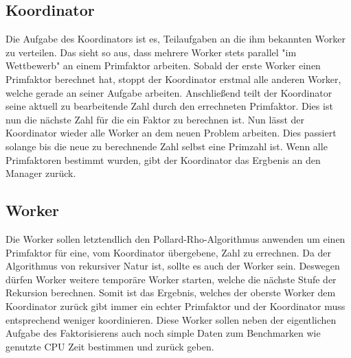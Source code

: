 \documentclass[a4paper, 12pt]{scrartcl}
\begin{document}
\subsection{Koordinator}
Die Aufgabe des Koordinators ist es, Teilaufgaben an die ihm bekannten Worker zu verteilen. Das sieht so aus, dass mehrere Worker stets parallel "im Wettbewerb" an einem Primfaktor arbeiten. Sobald der erste Worker einen Primfaktor berechnet hat, stoppt der Koordinator erstmal alle anderen Worker, welche gerade an seiner Aufgabe arbeiten. Anschließend teilt der Koordinator seine aktuell zu bearbeitende Zahl durch den errechneten Primfaktor. Dies ist nun die nächste Zahl für die ein Faktor zu berechnen ist. Nun lässt der Koordinator wieder alle Worker an dem neuen Problem arbeiten. Dies passiert solange bis die neue zu berechnende Zahl selbst eine Primzahl ist. Wenn alle Primfaktoren bestimmt wurden, gibt der Koordinator das Ergbenis an den Manager zurück.

\subsection{Worker}
Die Worker sollen letztendlich den Pollard-Rho-Algorithmus anwenden um einen Primfaktor für eine, vom Koordinator übergebene, Zahl zu errechnen. Da der Algorithmus von rekursiver Natur ist, sollte es auch der Worker sein. Deswegen dürfen Worker weitere temporäre Worker starten, welche die nächste Stufe der Rekursion berechnen. Somit ist das Ergebnis, welches der oberste Worker dem Koordinator zurück gibt immer ein echter Primfaktor und der Koordinator muss entsprechend weniger koordinieren. Diese Worker sollen neben der eigentlichen Aufgabe des Faktorisierens auch noch simple Daten zum Benchmarken wie genutzte CPU Zeit bestimmen und zurück geben.
\end{document}
